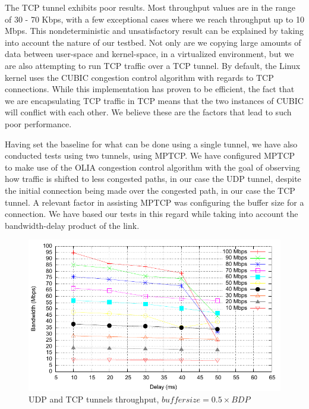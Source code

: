 The TCP tunnel exhibits poor results. Most throughput values are in the range
of 30 - 70 Kbps, with a few exceptional cases where we reach throughput up to
10 Mbps. This nondeterministic and unsatisfactory result can be explained by
taking into account the nature of our testbed. Not only are we copying large
amounts of data between user-space and kernel-space, in a virtualized
environment, but we are also attempting to run TCP traffic over a TCP tunnel.
By default, the Linux kernel uses the CUBIC congestion control algorithm with
regards to TCP connections. While this implementation has proven to be
efficient, the fact that we are encapsulating TCP traffic in TCP means that
the two instances of CUBIC will conflict with each other. We believe these are the
factors that lead to such poor performance.

Having set the baseline for what can be done using a single tunnel, we have
also conducted tests using two tunnels, using MPTCP. We have configured MPTCP
to make use of the OLIA congestion control algorithm with the goal of
observing how traffic is shifted to less congested paths, in our case the UDP
tunnel, despite the initial connection being made over the congested path, in
our case the TCP tunnel. A relevant factor in assisting MPTCP was configuring
the buffer size for a connection. We have based our tests in this regard while
taking into account the bandwidth-delay product of the link.

\begin{figure}
  \centering
  \includegraphics[width=\textwidth]{img/test-mptcp-05}
  \caption{UDP and TCP tunnels throughput, $buffer size = 0.5 \times BDP$}
  \label{fig:mptcp-0.5}
\end{figure}

